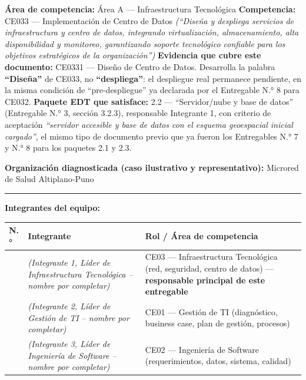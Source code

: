 \documentclass[11pt,a4paper]{article}
\begin{document}
\textbf{Área de competencia:} Área A --- Infraestructura Tecnológica
\textbf{Competencia:} CE033 --- Implementación de Centro de Datos \emph{(``Diseña y despliega servicios de infraestructura y centro de datos, integrando virtualización, almacenamiento, alta disponibilidad y monitoreo, garantizando soporte tecnológico confiable para los objetivos estratégicos de la organización'')}
\textbf{Evidencia que cubre este documento:} CE0331 --- Diseño de Centro de Datos. Desarrolla la palabra \textbf{``Diseña''} de CE033, no \textbf{``despliega''}: el despliegue real permanece pendiente, en la misma condición de ``pre-despliegue'' ya declarada por el Entregable N.° 8 para CE032.
\textbf{Paquete EDT que satisface:} 2.2 --- ``Servidor/nube y base de datos'' (Entregable N.° 3, sección 3.2.3), responsable Integrante 1, con criterio de aceptación \emph{``servidor accesible y base de datos con el esquema geoespacial inicial cargado''}, el mismo tipo de documento previo que ya fueron los Entregables N.° 7 y N.° 8 para los paquetes 2.1 y 2.3.

\textbf{Organización diagnosticada (caso ilustrativo y representativo):} Microred de Salud Altiplano-Puno

\begin{center}\rule{0.5\linewidth}{0.5pt}\end{center}

\textbf{Integrantes del equipo:}

{\small
\begin{longtable}[]{@{}
  >{\raggedright\arraybackslash}p{}
  >{\raggedright\arraybackslash}p{}
  >{\raggedright\arraybackslash}p{}@{}}
\toprule\noalign{}
\begin{minipage}[b]{\linewidth}\raggedright
N.°
\end{minipage} & \begin{minipage}[b]{\linewidth}\raggedright
Integrante
\end{minipage} & \begin{minipage}[b]{\linewidth}\raggedright
Rol / Área de competencia
\end{minipage} \\
\midrule\noalign{}
\endhead
\bottomrule\noalign{}
\endlastfoot
1 & \textit{(Integrante 1, Líder de Infraestructura Tecnológica -- nombre por completar)} & CE03 --- Infraestructura Tecnológica (red, seguridad, centro de datos) --- \textbf{responsable principal de este entregable} \\
2 & \textit{(Integrante 2, Líder de Gestión de TI -- nombre por completar)} & CE01 --- Gestión de TI (diagnóstico, business case, plan de gestión, procesos) \\
3 & \textit{(Integrante 3, Líder de Ingeniería de Software -- nombre por completar)} & CE02 --- Ingeniería de Software (requerimientos, datos, sistema, calidad) \\
\end{longtable}
}
\end{document}
